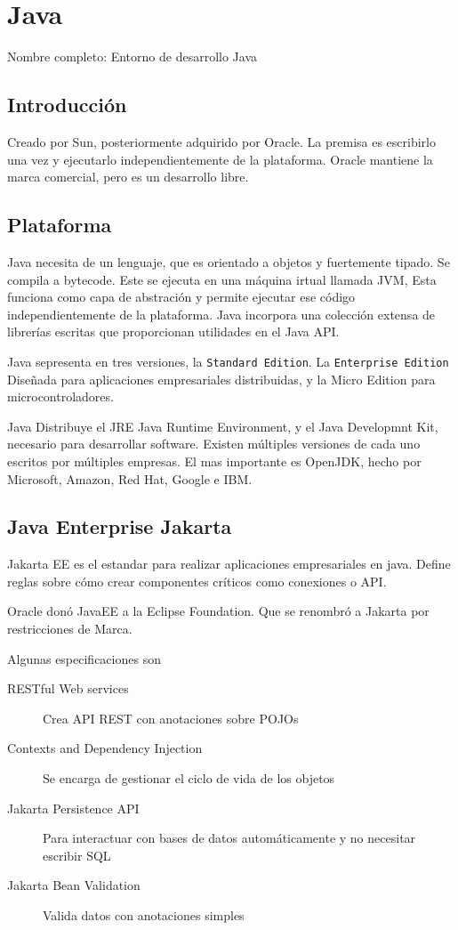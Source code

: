 \setcounter{section}{67}
\section{Java}

Nombre completo: Entorno de desarrollo Java

\localtableofcontents

\subsection{Introducción}
    Creado por Sun, posteriormente adquirido por Oracle. La premisa es escribirlo una vez y ejecutarlo independientemente de la plataforma. Oracle mantiene la marca comercial, pero es un desarrollo libre.

\subsection{Plataforma}
    Java necesita de un lenguaje, que es orientado a objetos y fuertemente tipado. Se compila a bytecode. Este se ejecuta en una máquina irtual llamada JVM, Esta funciona como capa de abstración y permite ejecutar ese código independientemente de la plataforma. Java incorpora una colección extensa de librerías escritas que proporcionan utilidades en el Java API.

    Java sepresenta en tres versiones, la \texttt{Standard Edition}. La \texttt{Enterprise Edition} Diseñada para aplicaciones empresariales distribuidas, y la Micro Edition para microcontroladores.

    Java Distribuye el JRE Java Runtime Environment, y el Java Developmnt Kit, necesario para desarrollar software. Existen múltiples versiones de cada uno escritos por múltiples empresas. El mas importante es OpenJDK, hecho por Microsoft, Amazon, Red Hat, Google e IBM.

\subsection{Java Enterprise Jakarta}
    Jakarta EE es el estandar para realizar aplicaciones empresariales en java. Define reglas sobre cómo crear componentes críticos como conexiones o API.

    Oracle donó JavaEE a la Eclipse Foundation. Que se renombró a Jakarta por restricciones de Marca.

    Algunas especificaciones son

    \begin{description}
        \item[RESTful Web services] Crea API REST con anotaciones sobre POJOs
        \item[Contexts and Dependency Injection] Se encarga de gestionar el ciclo de vida de los objetos
        \item[Jakarta Persistence API] Para interactuar con bases de datos automáticamente y no necesitar escribir SQL
        \item[Jakarta Bean Validation] Valida datos con anotaciones simples
    \end{description}

